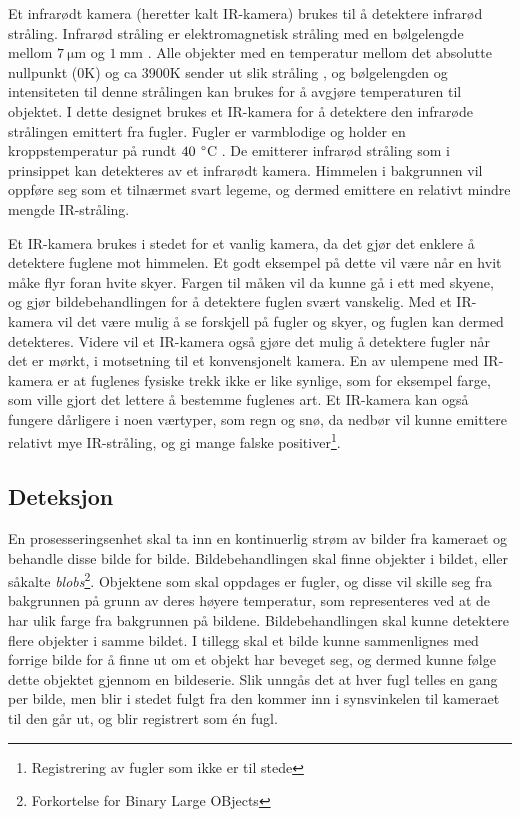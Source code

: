Et infrarødt kamera (heretter kalt IR-kamera) brukes til å detektere infrarød stråling. 
Infrarød stråling er elektromagnetisk stråling med en bølgelengde mellom $\SI{7}{\micro\meter}$ og $\SI{1}{\milli\meter}$ \cite{SNL-IR}.
Alle objekter med en temperatur mellom det absolutte nullpunkt (0K) og ca 3900K sender ut slik stråling \cite{SNL-IR}, og bølgelengden og intensiteten til denne strålingen kan brukes for å avgjøre temperaturen til objektet. 
I dette designet brukes et IR-kamera for å detektere den infrarøde strålingen emittert fra fugler. 
Fugler er varmblodige og holder en kroppstemperatur på rundt $\SI{40}\:{\degree}$C \cite{snlfugl}.
De emitterer infrarød stråling som i prinsippet kan detekteres av et infrarødt kamera.
Himmelen i bakgrunnen vil oppføre seg som et tilnærmet svart legeme, og dermed emittere en relativt mindre mengde IR-stråling.

Et IR-kamera brukes i stedet for et vanlig kamera, da det gjør det enklere å detektere fuglene mot himmelen. 
Et godt eksempel på dette vil være når en hvit måke flyr foran hvite skyer. 
Fargen til måken vil da kunne gå i ett med skyene, og gjør bildebehandlingen for å detektere fuglen svært vanskelig. 
Med et IR-kamera vil det være mulig å se forskjell på fugler og skyer, og fuglen kan dermed detekteres. 
Videre vil et IR-kamera også gjøre det mulig å detektere fugler når det er mørkt, i motsetning til et konvensjonelt kamera. 
En av ulempene med IR-kamera er at fuglenes fysiske trekk ikke er like synlige, som for eksempel farge, som ville gjort det lettere å bestemme fuglenes art.
Et IR-kamera kan også fungere dårligere i noen værtyper, som regn og snø, da nedbør vil kunne emittere relativt mye IR-stråling, og gi mange falske positiver\footnote{Registrering av fugler som ikke er til stede}.

\subsection{Deteksjon}\label{sec:design:deteksjon}

En prosesseringsenhet skal ta inn en kontinuerlig strøm av bilder fra kameraet og behandle disse bilde for bilde. 
Bildebehandlingen skal finne objekter i bildet, eller såkalte \textit{blobs}\footnote{Forkortelse for Binary Large OBjects}. 
Objektene som skal oppdages er fugler, og disse vil skille seg fra bakgrunnen på grunn av deres høyere temperatur, som representeres ved at de har ulik farge fra bakgrunnen på bildene. 
Bildebehandlingen skal kunne detektere flere objekter i samme bildet. 
I tillegg skal et bilde kunne sammenlignes med forrige bilde for å finne ut om et objekt har beveget seg, og dermed kunne følge dette objektet gjennom en bildeserie. 
Slik unngås det at hver fugl telles en gang per bilde, men blir i stedet fulgt fra den kommer inn i synsvinkelen til kameraet til den går ut, og blir registrert som én fugl.

